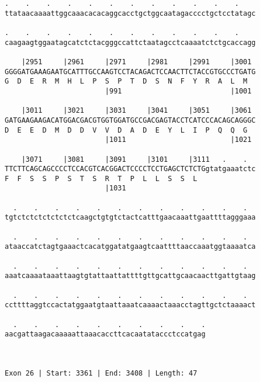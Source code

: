 \documentclass{article}
\begin{document}
\begin{Verbatim}
.    .    .    .    .    .    .    .    .    .    .    .    
ttataacaaaattggcaaacacacaggcacctgctggcaatagacccctgctcctatagc
                                                            
.    .    .    .    .    .    .    .    .    .    .    .    
caagaagtggaatagcatctctacgggccattctaatagcctcaaaatctctgcaccagg
                                                            
    |2951     |2961     |2971     |2981     |2991     |3001 
GGGGATGAAAGAATGCATTTGCCAAGTCCTACAGACTCCAACTTCTACCGTGCCCTGATG
G  D  E  R  M  H  L  P  S  P  T  D  S  N  F  Y  R  A  L  M  
                        |991                          |1001 
  
    |3011     |3021     |3031     |3041     |3051     |3061 
GATGAAGAAGACATGGACGACGTGGTGGATGCCGACGAGTACCTCATCCCACAGCAGGGC
D  E  E  D  M  D  D  V  V  D  A  D  E  Y  L  I  P  Q  Q  G  
                        |1011                         |1021 
  
    |3071     |3081     |3091     |3101     |3111   .    .  
TTCTTCAGCAGCCCCTCCACGTCACGGACTCCCCTCCTGAGCTCTCTGgtatgaaatctc
F  F  S  S  P  S  T  S  R  T  P  L  L  S  S  L              
                        |1031                               
  
  .    .    .    .    .    .    .    .    .    .    .    .  
tgtctctctctctctctcaagctgtgtctactcatttgaacaaattgaattttagggaaa
                                                            
  .    .    .    .    .    .    .    .    .    .    .    .  
ataaccatctagtgaaactcacatggatatgaagtcaattttaaccaaatggtaaaatca
                                                            
  .    .    .    .    .    .    .    .    .    .    .    .  
aaatcaaaataaattaagtgtattaattattttgttgcattgcaacaacttgattgtaag
                                                            
  .    .    .    .    .    .    .    .    .    .    .    .  
ccttttaggtccactatggaatgtaattaaatcaaaactaaacctagttgctctaaaact
                                                            
  .    .    .    .    .    .    .    .    .    .
aacgattaagacaaaaattaaacaccttcacaatataccctccatgag
                                                
                                                
 
Exon 26 | Start: 3361 | End: 3408 | Length: 47




\end{Verbatim}
\end{document}
